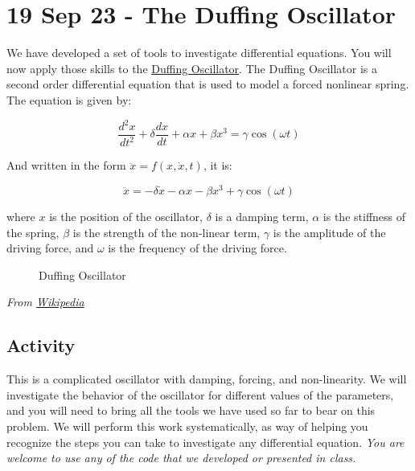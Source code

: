 \section{19 Sep 23 - The Duffing
Oscillator}\label{sep-23---the-duffing-oscillator}

We have developed a set of tools to investigate differential equations.
You will now apply those skills to the
\href{https://en.wikipedia.org/wiki/Duffing_equation}{Duffing
Oscillator}. The Duffing Oscillator is a second order differential
equation that is used to model a forced nonlinear spring. The equation
is given by:

\[\frac{d^2x}{dt^2} + \delta \frac{dx}{dt} + \alpha x + \beta x^3 = \gamma \cos(\omega t)\]

And written in the form \(\ddot{x} = f(x, \dot{x}, t)\), it is:

\[\ddot{x} = - \delta \dot{x} - \alpha x - \beta x^3 + \gamma \cos(\omega t)\]

where \(x\) is the position of the oscillator, \(\delta\) is a damping
term, \(\alpha\) is the stiffness of the spring, \(\beta\) is the
strength of the non-linear term, \(\gamma\) is the amplitude of the
driving force, and \(\omega\) is the frequency of the driving force.

\begin{figure}
\centering
{}
\caption{Duffing Oscillator}
\end{figure}

\emph{From
\href{https://commons.wikimedia.org/wiki/File:Duffing_oscillator_strange_attractor_with_color.gif}{Wikipedia}}

\subsection{Activity}\label{activity}

This is a complicated oscillator with damping, forcing, and
non-linearity. We will investigate the behavior of the oscillator for
different values of the parameters, and you will need to bring all the
tools we have used so far to bear on this problem. We will perform this
work systematically, as way of helping you recognize the steps you can
take to investigate any differential equation. \emph{You are welcome to
use any of the code that we developed or presented in class.}

